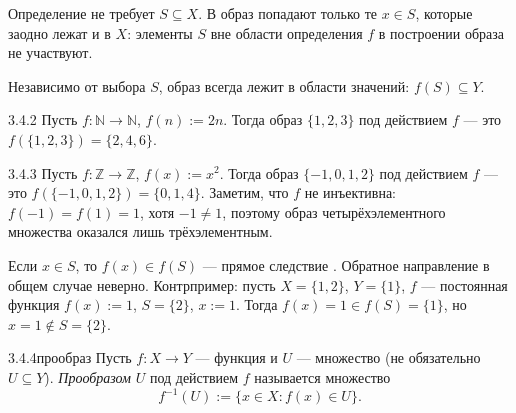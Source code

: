 \begin{remark}
Определение не требует $S\subseteq X$. В образ попадают только те $x\in S$, которые заодно
лежат и в $X$: элементы $S$ вне области определения $f$ в построении образа не участвуют.
\end{remark}

\begin{remark}
Независимо от выбора $S$, образ всегда лежит в области значений: $f(S)\subseteq Y$.
\end{remark}

\begin{example}{3.4.2}{}
Пусть $f:\mathbb{N}\to\mathbb{N}$, $f(n):=2n$. Тогда образ $\{1,2,3\}$ под действием $f$ —
это $f(\{1,2,3\}) = \{2,4,6\}$.
\end{example}

\begin{example}{3.4.3}{}
Пусть $f:\mathbb{Z}\to\mathbb{Z}$, $f(x):=x^2$. Тогда образ $\{-1,0,1,2\}$ под действием $f$
— это $f(\{-1,0,1,2\}) = \{0,1,4\}$. Заметим, что $f$ не инъективна: $f(-1)=f(1)=1$, хотя
$-1\neq1$, поэтому образ четырёхэлементного множества оказался лишь трёхэлементным.
\end{example}

\begin{remark}
Если $x\in S$, то $f(x)\in f(S)$ — прямое следствие .
Обратное направление в общем случае неверно. Контрпример: пусть $X=\{1,2\}$, $Y=\{1\}$, $f$ —
постоянная функция $f(x):=1$, $S=\{2\}$, $x:=1$. Тогда $f(x)=1\in f(S)=\{1\}$, но
$x=1\notin S=\{2\}$.
\end{remark}

\begin{definition}{3.4.4}{прообраз}
Пусть $f:X\to Y$ — функция и $U$ — множество (не обязательно $U\subseteq Y$).
\emph{Прообразом} $U$ под действием $f$ называется множество
\[
  f^{-1}(U) := \{x\in X : f(x)\in U\}.
\]
\end{definition}

